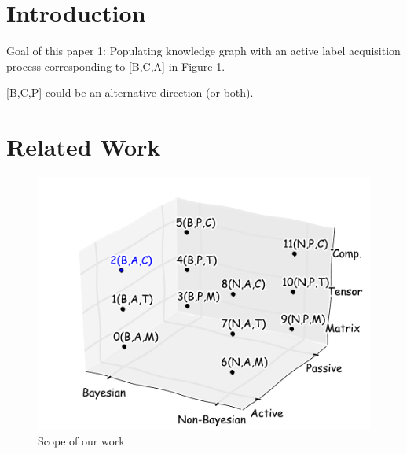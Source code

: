\documentclass{article}
\begin{document}

\begin{abstract}
\end{abstract}

\section{Introduction}
Goal of this paper 1: Populating knowledge graph with an active label acquisition process corresponding to [B,C,A] in Figure \ref{fig:related3d}.

[B,C,P] could be an alternative direction (or both).

\section{Related Work}

\begin{figure}[t]
	\centering
	\includegraphics[width=\linewidth]{images/3d_plot.pdf}			
	\caption{\label{fig:related3d}Scope of our work}
\end{figure}
\end{document}

